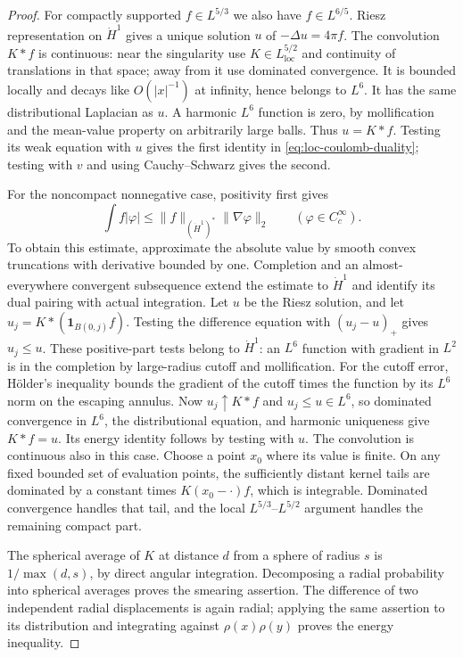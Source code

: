 \begin{proof}
For compactly supported $f\in L^{5/3}$ we also have $f\in L^{6/5}$.
Riesz representation on $\dot H^1$ gives a unique solution $u$ of
$-\Delta u=4\pi f$.  The convolution $K*f$ is continuous: near the
singularity use $K\in L^{5/2}_{\mathrm{loc}}$ and continuity of
translations in that space; away from it use dominated convergence.
It is bounded locally and decays like $O(|x|^{-1})$ at infinity,
hence belongs to $L^6$.  It has the same distributional Laplacian as
$u$.  A harmonic $L^6$ function is zero, by mollification and the
mean-value property on arbitrarily large balls.  Thus $u=K*f$.
Testing its weak equation with $u$ gives the first identity in
\eqref{eq:loc-coulomb-duality}; testing with $v$ and using
Cauchy--Schwarz gives the second.

For the noncompact nonnegative case, positivity first gives
\[
 \int f|\varphi|\leq\|f\|_{(\dot H^1)^*}\|\nabla\varphi\|_2
 \qquad(\varphi\in C_c^\infty).
\]
To obtain this estimate, approximate the absolute value by smooth
convex truncations with derivative bounded by one.  Completion and
an almost-everywhere convergent subsequence extend the estimate to
$\dot H^1$ and identify its dual pairing with actual integration.
Let $u$ be the Riesz solution, and let
$u_j=K*(\mathbf1_{B(0,j)}f)$.  Testing the difference equation with
$(u_j-u)_+$ gives $u_j\leq u$.  These positive-part tests belong to
$\dot H^1$: an $L^6$ function with gradient in $L^2$ is in the
completion by large-radius cutoff and mollification.  For the cutoff
error, H\"older's inequality bounds the gradient of the cutoff times
the function by its $L^6$ norm on the escaping annulus.  Now
$u_j\uparrow K*f$ and $u_j\leq u\in L^6$, so dominated convergence
in $L^6$, the distributional equation, and harmonic uniqueness give
$K*f=u$.  Its energy identity follows by testing with $u$.
The convolution is continuous also in this case.  Choose a point $x_0$
where its value is finite.  On any fixed bounded set of evaluation points,
the sufficiently distant kernel tails are dominated by a constant times
$K(x_0-\cdot)f$, which is integrable.  Dominated convergence handles that
tail, and the local $L^{5/3}$--$L^{5/2}$ argument handles the remaining
compact part.

The spherical average of $K$ at distance $d$ from a sphere of radius
$s$ is $1/\max(d,s)$, by direct angular integration.  Decomposing a
radial probability into spherical averages proves the smearing
assertion.  The difference of two independent radial displacements
is again radial; applying the same assertion to its distribution
and integrating against $\rho(x)\rho(y)$ proves the energy inequality.
\end{proof}

